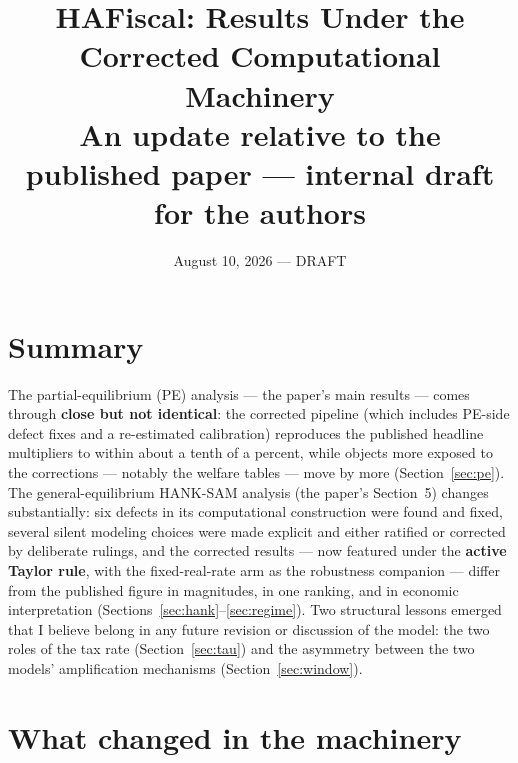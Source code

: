 \documentclass[11pt]{article}
\title{HAFiscal: Results Under the Corrected Computational Machinery\\
\large An update relative to the published paper --- internal draft for the authors}
\author{}
\date{August 10, 2026 --- DRAFT}
\begin{document}
\maketitle

\noindent{}

\section{Summary}

The partial-equilibrium (PE) analysis --- the paper's main results ---
comes through \textbf{close but not identical}: the corrected pipeline
(which includes PE-side defect fixes and a re-estimated calibration)
reproduces the published headline multipliers to within about a tenth
of a percent, while objects more exposed to the corrections --- notably
the welfare tables --- move by more (Section~\ref{sec:pe}). The
general-equilibrium HANK-SAM analysis (the paper's Section~5) changes
substantially: six defects in its computational construction were found
and fixed, several silent modeling choices were made explicit and either
ratified or corrected by deliberate rulings, and the corrected results
--- now featured under the \textbf{active Taylor rule}, with the
fixed-real-rate arm as the robustness companion --- differ from the
published figure in magnitudes, in one ranking, and in economic
interpretation (Sections~\ref{sec:hank}--\ref{sec:regime}). Two
structural lessons emerged that I believe belong in any future revision
or discussion of the model: the two roles of the tax rate
(Section~\ref{sec:tau}) and the asymmetry between the two models'
amplification mechanisms (Section~\ref{sec:window}).

\section{What changed in the machinery}
\label{sec:machinery}
\end{document}
